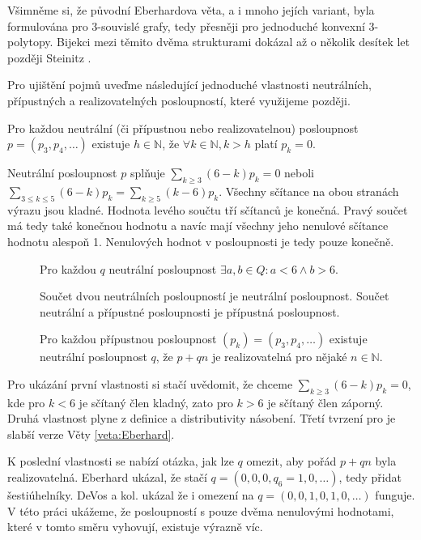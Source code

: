 Všimněme si, že původní Eberhardova věta, a i mnoho jejích variant, byla formulována pro 3-souvislé grafy, tedy přesněji pro jednoduché konvexní 3-polytopy. Bijekci mezi těmito dvěma strukturami dokázal až o několik desítek let později Steinitz \cite{Steinitz}. 

Pro ujištění pojmů uveďme následující jednoduché vlastnosti neutrálních, přípustných a realizovatelných posloupností, které využijeme později.
\begin{tvrz}
Pro každou neutrální (či přípustnou nebo realizovatelnou) posloupnost $p=(p_3,p_4,\dots)$ existuje $h \in \mathbb{N}$, že $ \forall k \in \mathbb{N}, k>h $ platí $ p_k=0$.
\end{tvrz}

\begin{dukaz}
Neutrální posloupnost $p$ splňuje $\sum_{k \geq 3}{(6-k)p_k}=0$ neboli $\sum_{3 \leq k \leq 5}{(6-k)p_k}=\sum_{k \geq 5}{(k-6)p_k}$. Všechny sčítance na obou stranách výrazu jsou kladné. Hodnota levého součtu tří sčítanců je konečná. Pravý součet má tedy také konečnou hodnotu a navíc mají všechny jeho nenulové sčítance hodnotu alespoň 1. Nenulových hodnot v posloupnosti je tedy pouze konečně. 
\end{dukaz}

\begin{tvrz}\label{veta:posloupnosti}
\begin{description}
\item[] Pro každou $q$ neutrální posloupnost $\exists a,b \in Q : a <6 \wedge b>6$.
\item[] Součet dvou neutrálních posloupností je neutrální posloupnost. Součet neutrální a přípustné posloupnosti je přípustná posloupnost.
\item[] Pro každou přípustnou posloupnost $(p_k) = (p_3,p_4,\dots)$ existuje neutrální posloupnost $q$, že $p+qn$ je realizovatelná pro nějaké $n \in \mathbb{N}$.
\end{description}
\end{tvrz}

\begin{dukaz}
Pro ukázání první vlastnosti si stačí uvědomit, že chceme $\sum_{k \geq 3}{(6-k)p_k} = 0$, kde pro $k < 6$ je sčítaný člen kladný, zato pro $k>6$ je sčítaný člen záporný. Druhá vlastnost plyne z definice a distributivity násobení. Třetí tvrzení pro je slabší verze Věty \ref{veta:Eberhard}.
\end{dukaz}
K poslední vlastnosti se nabízí otázka, jak lze $q$ omezit, aby pořád $p+qn$ byla realizovatelná. Eberhard ukázal, že stačí  $q = (0,0,0,q_6=1,0,\dots)$, tedy přidat šestiúhelníky. DeVos a kol. ukázal že i omezení na  $q = (0,0,1,0,1,0,\dots)$ funguje. V této práci ukážeme, že posloupností s pouze dvěma nenulovými hodnotami, které v tomto směru vyhovují, existuje výrazně víc.



